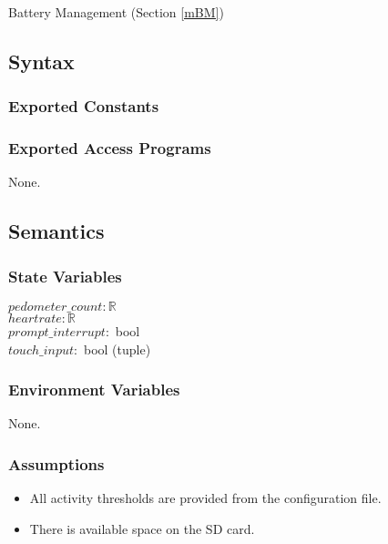 \documentclass[12pt, titlepage]{article}
\begin{document}
Battery Management (Section \ref{mBM})

\subsection{Syntax}

\subsubsection{Exported Constants}


\subsubsection{Exported Access Programs}

None.

\subsection{Semantics}

\subsubsection{State Variables}

$pedometer\_count: \mathbb{R}$ \\
$heartrate: \mathbb{R}$ \\
$prompt\_interrupt:$ bool \\
$touch\_input:$ bool (tuple) \\


\subsubsection{Environment Variables}

None.

\subsubsection{Assumptions}
\begin{itemize}

\item All activity thresholds are provided from the configuration file. \\
\item There is available space on the SD card. \\
\end{itemize}
\end{document}
